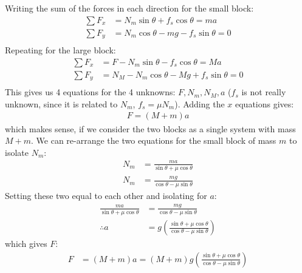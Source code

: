 \begin{solution}
Writing the sum of the forces in each direction for the small block:
\begin{align*}
\sum F_x &= N_m\sin\theta+f_s\cos\theta = ma \\
\sum F_y &= N_m\cos\theta-mg-f_s\sin\theta = 0 \\
\end{align*}
Repeating for the large block:
\begin{align*}
\sum F_x &= F-N_m\sin\theta-f_s\cos\theta = Ma \\
\sum F_y &= N_M-N_m\cos\theta-Mg+f_s\sin\theta = 0 \\
\end{align*}
This gives us 4 equations for the 4 unknowns: ${F, N_m, N_M, a}$ ($f_s$ is not really unknown, since it is related to $N_m$, $f_s=\mu N_m$). Adding the $x$ equations gives:
\begin{align*}
F = (M+m)a
\end{align*}
which makes sense, if we consider the two blocks as a single system with mass $M+m$. We can re-arrange the two equations for the small block of mass $m$ to isolate $N_m$:
\begin{align*}
N_m& = \frac{ma}{\sin\theta+\mu\cos\theta} \\
N_m& = \frac{mg}{\cos\theta-\mu\sin\theta}
\end{align*}
Setting these two equal to each other and isolating for $a$:
\begin{align*}
\frac{ma}{\sin\theta+\mu\cos\theta} &= \frac{mg}{\cos\theta-\mu\sin\theta}\\
\therefore a&=g\left(\frac{\sin\theta+\mu\cos\theta}{\cos\theta-\mu\sin\theta}\right)
\end{align*}
which gives $F$:
\begin{align*}
F &=(M+m)a=(M+m)g\left(\frac{\sin\theta+\mu\cos\theta}{\cos\theta-\mu\sin\theta}\right)
\end{align*}
\end{solution}


